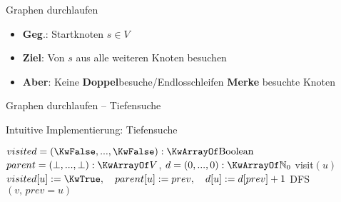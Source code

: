 





	
	

\begin{frame}{Graphen durchlaufen}
	\begin{itemize}
		\item \textbf{Geg}.: Startknoten $s \in V$
		\item \textbf{Ziel}: Von $s$ aus alle weiteren Knoten besuchen
		\pause
		\item \textbf{Aber}: Keine \textbf{Doppel}besuche/Endlosschleifen \impl \textbf{Merke} besuchte Knoten
	\end{itemize}
\end{frame}

\morescalingdelimiters

\begin{frame}{Graphen durchlaufen – Tiefensuche}
	\begin{exampleblock}{Intuitive Implementierung: Tiefensuche}
		\begin{algorithm}[H]
			\small
			 {
				$visited = (\KwFalse, ... , \KwFalse): \KwArrayOf \|Boolean|$ \;
				$parent = (\bot, ... , \bot): \KwArrayOf V$, \qquad $d = (0, ..., 0): \KwArrayOf \N_0$  \;
				\smallskip
				 {
					 {
						visit$(u)$   \;
						$visited[u] := \KwTrue, \quad parent[u] := prev, \quad  d[u] := d[prev] + 1$\;
						 {
							DFS$(v,\, prev = u)$
						}
					}
				}
				\smallskip
			}
		\end{algorithm}
	\end{exampleblock}
\end{frame}

